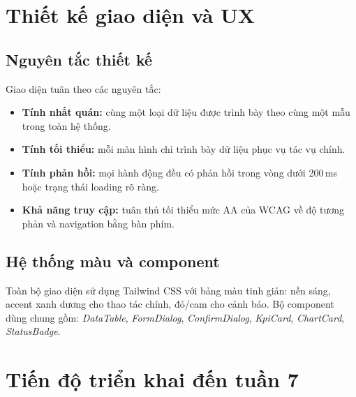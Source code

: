 \section{Thiết kế giao diện và UX}
\label{sec:ui}

\subsection{Nguyên tắc thiết kế}
Giao diện tuân theo các nguyên tắc:
\begin{itemize}[leftmargin=1.2cm]
    \item \textbf{Tính nhất quán:} cùng một loại dữ liệu được trình bày theo cùng một mẫu trong toàn hệ thống.
    \item \textbf{Tính tối thiểu:} mỗi màn hình chỉ trình bày dữ liệu phục vụ tác vụ chính.
    \item \textbf{Tính phản hồi:} mọi hành động đều có phản hồi trong vòng dưới 200\,ms hoặc trạng thái loading rõ ràng.
    \item \textbf{Khả năng truy cập:} tuân thủ tối thiểu mức AA của WCAG về độ tương phản và navigation bằng bàn phím.
\end{itemize}

\subsection{Hệ thống màu và component}
Toàn bộ giao diện sử dụng Tailwind CSS \cite{tailwindDoc} với bảng màu tinh giản: nền sáng, accent xanh dương cho thao tác chính, đỏ/cam cho cảnh báo. Bộ component dùng chung gồm: \emph{DataTable}, \emph{FormDialog}, \emph{ConfirmDialog}, \emph{KpiCard}, \emph{ChartCard}, \emph{StatusBadge}.

\section{Tiến độ triển khai đến tuần 7}
\label{sec:progress}

